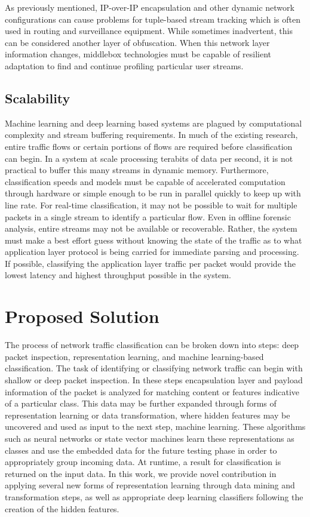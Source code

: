 As previously mentioned, IP-over-IP encapsulation and other dynamic network configurations can cause problems for tuple-based stream tracking which is often used in routing and surveillance equipment. While sometimes inadvertent, this can be considered another layer of obfuscation. When this network layer information changes, middlebox technologies must be capable of resilient adaptation to find and continue profiling particular user streams.

\subsection{Scalability}

Machine learning and deep learning based systems are plagued by computational complexity and stream buffering requirements. In much of the existing research, entire traffic flows or certain portions of flows are required before classification can begin. In a system at scale processing terabits of data per second, it is not practical to buffer this many streams in dynamic memory. Furthermore, classification speeds and models must be capable of accelerated computation through hardware or simple enough to be run in parallel quickly to keep up with line rate. For real-time classification, it may not be possible to wait for multiple packets in a single stream to identify a particular flow. Even in offline forensic analysis, entire streams may not be available or recoverable. Rather, the system must make a best effort guess without knowing the state of the traffic as to what application layer protocol is being carried for immediate parsing and processing. If possible, classifying the application layer traffic per packet would provide the lowest latency and highest throughput possible in the system.

\section{Proposed Solution}

The process of network traffic classification can be broken down into steps: deep packet inspection, representation learning, and machine learning-based classification. The task of identifying or classifying network traffic can begin with shallow or deep packet inspection. In these steps encapsulation layer and payload information of the packet is analyzed for matching content or features indicative of a particular class. This data may be further expanded through forms of representation learning or data transformation, where hidden features may be uncovered and used as input to the next step, machine learning. These algorithms such as neural networks or state vector machines learn these representations as classes and use the embedded data for the future testing phase in order to appropriately group incoming data. At runtime, a result for classification is returned on the input data. In this work, we provide novel contribution in applying several new forms of representation learning through data mining and transformation steps, as  well as appropriate deep learning classifiers following the creation of the hidden features.

